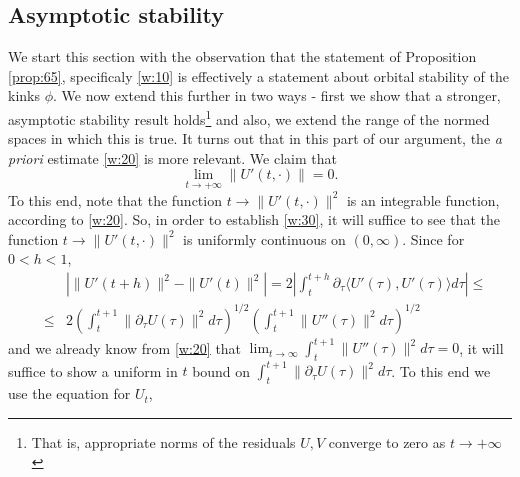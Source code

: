 \documentclass[12pt]{amsart}
\theoremstyle{definition}
\theoremstyle{remark}
\numberwithin{equation}{section}
\renewcommand{\(}{\left(}
\renewcommand{\)}{\right)}
\renewcommand{\[}{\left[}
\renewcommand{\]}{\right]}
\newcommand{\f}[2]{\frac{#1}{#2}}
\newcommand{\dpr}[2]{\langle #1,#2 \rangle}
\newcommand{\p}{\partial}
\begin{document}
\subsection{Asymptotic stability} 
We start this section with the observation that the statement of Proposition \ref{prop:65}, specificaly \eqref{w:10} is effectively a statement about orbital stability of the kinks $\phi$. We now extend this further in two ways - first we show that a stronger, asymptotic stability result holds\footnote{That is, appropriate norms of the residuals $U,V$ converge to zero as $t\to +\infty$} and also, we extend the range of the normed spaces in which this is true. It turns out that in this part of our argument, the {\it a priori} estimate \eqref{w:20} is more relevant. 
We claim that 
\begin{equation}
	\label{w:30} 
	\lim_{t\to +\infty} \|U'(t, \cdot)\|=0. 
\end{equation}
To this end,  note that the function $t\to \|U'(t, \cdot)\|^2$ is an integrable function, according to \eqref{w:20}. So, in order to establish \eqref{w:30}, it will suffice to see that the function $t\to \|U'(t, \cdot)\|^2$ is uniformly continuous on $(0, \infty)$. Since for $0<h<1$, 
	\begin{eqnarray*}
		& & \left| \|U'(t+h)\|^2-\|U'(t)\|^2\right|=2 |\int_{t}^{t+h} \p_\tau \dpr{U'(\tau)}{U'(\tau)} d\tau|\leq \\
		&\leq &  2 \left(\int_t^{t+1} \|\p_\tau U(\tau)\|^2 d\tau\right)^{1/2} 
		\left(\int_t^{t+1} \|U''(\tau)\|^2 d\tau\right)^{1/2}
\end{eqnarray*} and we already know from \eqref{w:20} that $\lim_{t\to \infty} \int_t^{t+1} \|U''(\tau)\|^2 d\tau=0$, it will suffice to show a uniform in $t$ bound on $\int_t^{t+1} \|\p_\tau U(\tau)\|^2 d\tau$. To this end we use the equation for $U_t$, 
\end{document}
